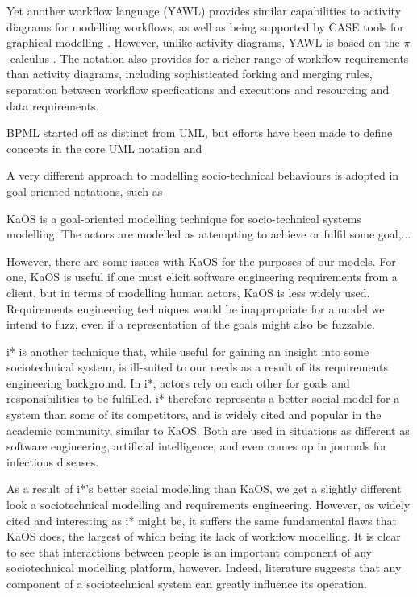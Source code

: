 \documentclass{sig-alternate}
\newcommand{\picalc}{\(\pi\)-calculus }
\begin{document}
Yet another workflow language (YAWL) provides similar capabilities to activity
diagrams for modelling workflows, as well as being supported by CASE tools for
graphical modelling \cite{hofstede2010yawl}.  However, unlike activity diagrams,
YAWL is based on the \picalc\cite{Aalst2004}.  The notation also provides for a
richer range of workflow requirements than activity diagrams, including
sophisticated forking and merging rules, separation between workflow
specfications and executions and resourcing and data requirements.

BPML started off as distinct from UML, but efforts have been made to define concepts in the core UML notation \citep{White2004} and 

A very different approach to modelling socio-technical behaviours is adopted in
goal oriented notations, such as

KaOS is a goal-oriented modelling technique for socio-technical systems
modelling\cite{Werneck2009}.  The actors are modelled as attempting to achieve
or fulfil some goal,...

However, there are some issues with KaOS for the purposes of our models. For one, KaOS is useful if one must elicit software engineering requirements from a client, but in terms of modelling human actors, KaOS is less widely used. Requirements engineering techniques would be inappropriate for a model we intend to fuzz, even if a representation of the goals might also be fuzzable. \par 


i* is another technique that, while useful for gaining an insight into some sociotechnical system, is ill-suited to our needs as a result of its requirements engineering background\cite{Werneck2009}. In i*, actors rely on each other for goals and responsibilities to be fulfilled. i* therefore represents a better social model for a system than some of its competitors, and is widely cited and popular in the academic community, similar to KaOS. Both are used in situations as different as software engineering\cite{Almisned2010}, artificial intelligence\cite{VanDiggelen2010}, and even comes up in journals for infectious diseases\cite{Tutorial2007}. \par

As a result of i*'s better social modelling than KaOS, we get a slightly different look a sociotechnical modelling and requirements engineering. However, as widely cited and interesting as i* might be, it suffers the same fundamental flaws that KaOS does, the largest of which being its lack of workflow modelling. It is clear to see that interactions between people is an important component of any sociotechnical modelling platform, however. Indeed, literature suggests that any component of a sociotechnical system can greatly influence its operation\cite{crabtree00ethnomethodologically}. \par
\end{document}
